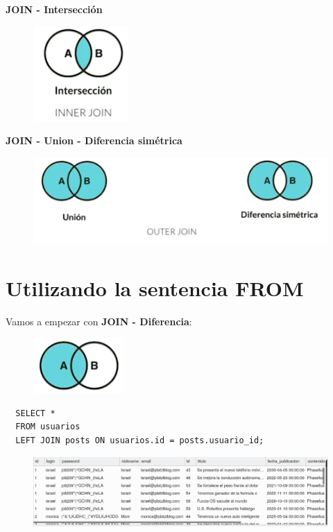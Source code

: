 \documentclass{article}
\begin{document}
\newpage

\textbf{JOIN - Intersección}\\
\begin{figure}[h!]
  \centering
  \includegraphics[scale=0.75]{./Pictures/085_join_interseccion.png}
\end{figure}

\textbf{JOIN - Union - Diferencia simétrica}\\
\begin{figure}[h!]
  \centering
  \includegraphics[scale=0.75]{./Pictures/086_join_outer.png}
\end{figure}


\section{Utilizando la sentencia FROM}%
Vamos a empezar con \textbf{JOIN - Diferencia}:

\begin{figure}[h!]
  \centering
  \includegraphics[scale=0.75]{./Pictures/089_join_left.png}
\end{figure}

\begin{verbatim}
  SELECT *
  FROM usuarios
  LEFT JOIN posts ON usuarios.id = posts.usuario_id;
\end{verbatim}

\begin{figure}[h!]
  \centering
  \includegraphics[scale=0.55]{./Pictures/087_join_left.png}
\end{figure}
\end{document}

